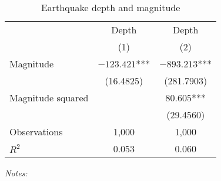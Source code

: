 \begin{table}[!htb]
\begin{adjustbox}{max width=\textwidth, max height=\textheight, center}
\begin{threeparttable}
\centering
\caption{Earthquake depth and magnitude}
\begin{tabular}{lcc}
\toprule
 & Depth & Depth \\
 & (1) & (2) \\
\midrule
Magnitude & $-123.421$*** & $-893.213$*** \\
 & (16.4825) & (281.7903) \\[0.5em]
Magnitude squared &  & $80.605$*** \\
 &  & (29.4560) \\[0.5em]
\midrule
Observations & 1,000 & 1,000 \\
$R^2$ & 0.053 & 0.060 \\
\bottomrule
\end{tabular}
\label{tab:mag:squared}
\begin{tablenotes}
\item {\em Notes:}
\end{tablenotes}
\end{threeparttable}
\end{adjustbox}
\end{table}

